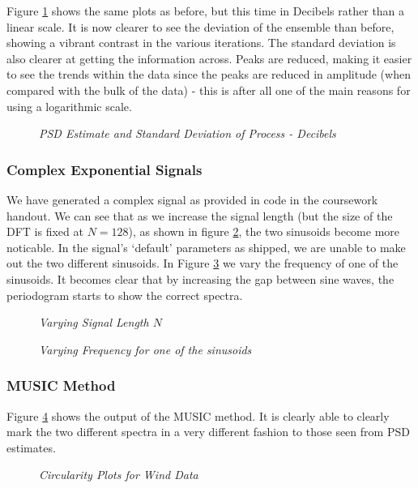 \documentclass[./main.tex]{subfiles}
\begin{document}
Figure \ref{fig:2_1_c} shows the same plots as before, but this time in Decibels rather than a linear scale. It is now clearer to see the deviation of the ensemble than before, showing a vibrant contrast in the various iterations. The standard deviation is also clearer at getting the information across. Peaks are reduced, making it easier to see the trends within the data since the peaks are reduced in amplitude (when compared with the bulk of the data) - this is after all one of the main reasons for using a logarithmic scale.

\begin{figure}[h]
	\centering 
	\resizebox{\textwidth}{!}{}
	\caption{\textit{PSD Estimate and Standard Deviation of Process - Decibels}}
	\label{fig:2_1_c}
\end{figure}


\subsubsection{Complex Exponential Signals}
We have generated a complex signal as provided in code in the coursework handout. We can see that as we increase the signal length (but the size of the DFT is fixed at $N=128$), as shown in figure \ref{fig:2_1_d_N}, the two sinusoids become more noticable. In the signal's `default' parameters as shipped, we are unable to make out the two different sinusoids. In Figure \ref{fig:2_1_d_freq} we vary the frequency of one of the sinusoids. It becomes clear that by increasing the gap between sine waves, the periodogram starts to show the correct spectra.


\begin{figure}[h]
	\centering 
	\resizebox{\textwidth}{!}{}
	\caption{\textit{Varying Signal Length $N$}}
	\label{fig:2_1_d_N}
\end{figure}

\begin{figure}[h]
	\centering 
	\resizebox{\textwidth}{!}{}
	\caption{\textit{Varying Frequency for one of the sinusoids}}
	\label{fig:2_1_d_freq}
\end{figure}


\subsubsection{MUSIC Method}

Figure \ref{fig:2_1_e} shows the output of the MUSIC method. It is clearly able to clearly mark the two different spectra in a very different fashion to those seen from PSD estimates.

\begin{figure}[h]
	\centering 
	\resizebox{0.6\textwidth}{!}{}
	\caption{\textit{Circularity Plots for Wind Data}}
	\label{fig:2_1_e}
\end{figure}
\end{document}
